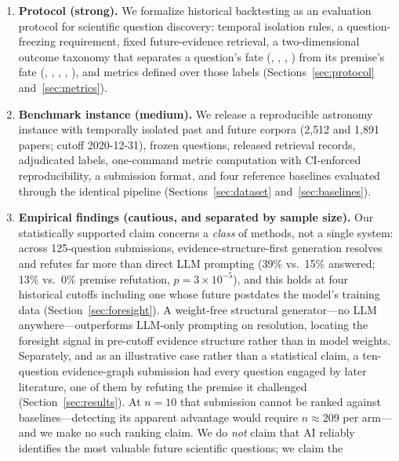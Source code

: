 \begin{enumerate}
  \item \textbf{Protocol (strong).} We formalize historical backtesting
    as an evaluation protocol for scientific question discovery:
    temporal isolation rules, a question-freezing requirement, fixed
    future-evidence retrieval, a two-dimensional outcome taxonomy that
    separates a question's fate (,
    , ,
    ) from its premise's fate
    (, , ,
    , ), and
    metrics defined over those labels (Sections~\ref{sec:protocol}
    and~\ref{sec:metrics}).
  \item \textbf{Benchmark instance (medium).} We release a reproducible
    astronomy instance with temporally isolated past and future corpora
    (2{,}512 and 1{,}891 papers; cutoff 2020-12-31), frozen questions,
    released retrieval records, adjudicated labels, one-command metric
    computation with CI-enforced reproducibility, a submission format,
    and four reference baselines evaluated through the identical
    pipeline (Sections~\ref{sec:dataset} and~\ref{sec:baselines}).
  \item \textbf{Empirical findings (cautious, and separated by sample
    size).} Our statistically supported claim concerns a \emph{class}
    of methods, not a single system: across 125-question submissions,
    evidence-structure-first generation resolves and refutes far more
    than direct LLM prompting (39\% vs.\ 15\% answered; 13\% vs.\ 0\%
    premise refutation, $p=3\times10^{-5}$), and this holds at four
    historical cutoffs including one whose future postdates the model's
    training data (Section~\ref{sec:foresight}). A weight-free
    structural generator---no LLM anywhere---outperforms LLM-only
    prompting on resolution, locating the foresight signal in
    pre-cutoff evidence structure rather than in model weights.
    Separately, and as an illustrative case rather than a statistical
    claim, a ten-question evidence-graph submission had every question
    engaged by later literature, one of them by refuting the premise it
    challenged (Section~\ref{sec:results}). At $n=10$ that submission
    cannot be ranked against baselines---detecting its apparent
    advantage would require $n\approx209$ per arm---and we make no such
    ranking claim. We do \emph{not} claim that AI reliably identifies
    the most valuable future scientific questions; we claim the

\end{enumerate}
